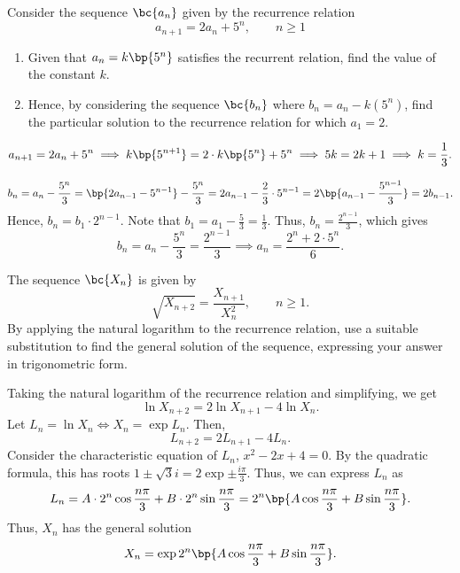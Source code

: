\clearpage
\begin{problem}
    Consider the sequence $\bc{a_n}$ given by the recurrence relation
    \[
        a_{n+1} = 2a_n + 5^n, \qquad n \geq 1
    \]

    \begin{enumerate}
        \item Given that $a_n = k\bp{5^n}$ satisfies the recurrent relation, find the value of the constant $k$.
        \item Hence, by considering the sequence $\bc{b_n}$ where $b_n = a_n - k(5^n)$, find the particular solution to the recurrence relation for which $a_1 = 2$.
    \end{enumerate}
\end{problem}
\begin{solution}
    \begin{ppart}
        \[a_{n+1} = 2a_n + 5^n \implies k\bp{5^{n+1}} = 2\cdot k\bp{5^n} + 5^n \implies 5k = 2k + 1 \implies k = \frac13.\]
    \end{ppart}
    \begin{ppart}
        \[b_n = a_n - \frac{5^n}3 = \bp{2a_{n-1} - 5^{n-1}} - \frac{5^n}3 = 2a_{n-1} - \frac23 \cdot 5^{n-1} = 2\bp{a_{n-1} - \frac{5^{n-1}}3} = 2b_{n-1}.\] Hence, $b_n = b_1 \cdot 2^{n-1}$. Note that $b_1 = a_1 - \frac53 = \frac13$. Thus, $b_n = \frac{2^{n-1}}3$, which gives 
        \[b_n = a_n - \frac{5^n}{3} = \frac{2^{n-1}}3 \implies a_n = \frac{2^n + 2 \cdot 5^n}6.\]
    \end{ppart}
\end{solution}

\begin{problem}
    The sequence $\bc{X_n}$ is given by \[\sqrt{X_{n+2}} = \frac{X_{n+1}}{X_n^2}, \qquad n \geq 1.\] By applying the natural logarithm to the recurrence relation, use a suitable substitution to find the general solution of the sequence, expressing your answer in trigonometric form.
\end{problem}
\begin{solution}
    Taking the natural logarithm of the recurrence relation and simplifying, we get \[\ln X_{n+2} = 2\ln X_{n+1} - 4\ln X_n.\] Let $L_n = \ln X_n \iff X_n = \exp{L_n}$. Then, \[L_{n+2} = 2L_{n+1} - 4L_n.\] Consider the characteristic equation of $L_n$, $x^2 - 2x + 4 = 0$. By the quadratic formula, this has roots $1 \pm \sqrt3 i = 2\exp{\pm \frac{i\pi}3}$. Thus, we can express $L_n$ as \[L_n = A \cdot 2^n \cos \frac{n\pi}3 + B \cdot 2^n \sin\frac{n\pi}3 = 2^n \bp{A \cos \frac{n\pi}3 + B \sin \frac{n\pi}3}.\] Thus, $X_n$ has the general solution \[X_n = \exp{2^n \bp{A \cos\frac{n\pi}3 + B \sin \frac{n\pi}3}}.\]
\end{solution}

